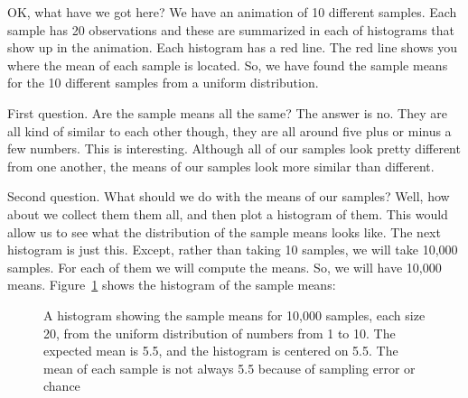 \documentclass[
  letterpaper,
  DIV=11,
  numbers=noendperiod]{scrreprt}
\begin{document}
OK, what have we got here? We have an animation of 10 different samples.
Each sample has 20 observations and these are summarized in each of
histograms that show up in the animation. Each histogram has a red line.
The red line shows you where the mean of each sample is located. So, we
have found the sample means for the 10 different samples from a uniform
distribution.

First question. Are the sample means all the same? The answer is no.
They are all kind of similar to each other though, they are all around
five plus or minus a few numbers. This is interesting. Although all of
our samples look pretty different from one another, the means of our
samples look more similar than different.

Second question. What should we do with the means of our samples? Well,
how about we collect them them all, and then plot a histogram of them.
This would allow us to see what the distribution of the sample means
looks like. The next histogram is just this. Except, rather than taking
10 samples, we will take 10,000 samples. For each of them we will
compute the means. So, we will have 10,000 means.
Figure~\ref{fig-4unifmany} shows the histogram of the sample means:

\begin{figure}


\caption{\label{fig-4unifmany}A histogram showing the sample means for
10,000 samples, each size 20, from the uniform distribution of numbers
from 1 to 10. The expected mean is 5.5, and the histogram is centered on
5.5. The mean of each sample is not always 5.5 because of sampling error
or chance}

\end{figure}%
\end{document}

